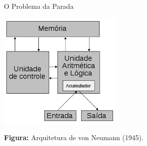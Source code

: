 \documentclass[xcolor=dvipsnames,table]{beamer}
\begin{document}
	\begin{frame}{O Problema da Parada}
		\begin{center}
			\includegraphics[width=6cm]{images/arqVonNeumann.png}
			
			{\bf Figura:} Arquitetura de von Neumann (1945).
		\end{center}
	\end{frame}
	
\end{document}
